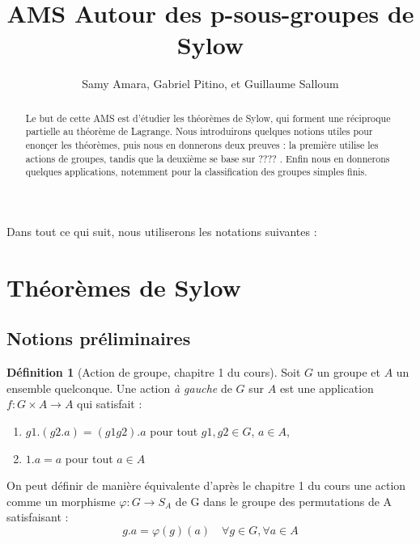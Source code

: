 \documentclass[french]{article}
\title{AMS Autour des p-sous-groupes de Sylow}
\author{Samy Amara, Gabriel Pitino, et Guillaume Salloum}
\date{}
\theoremstyle{definition}
\newtheorem{definition}[subsubsection]{Définition}
\theoremstyle{plain}
\theoremstyle{plain}
\theoremstyle{plain}
\theoremstyle{plain}
\theoremstyle{plain}
\begin{document}
\maketitle
\begin{abstract}
	Le but de cette AMS est d'étudier les théorèmes de Sylow, qui forment une réciproque partielle au théorème de Lagrange.
	Nous introduirons quelques notions utiles pour enonçer les théorèmes, puis nous en donnerons deux preuves : la première utilise les actions de groupes, tandis que la deuxième se base sur ????  .
	Enfin nous en donnerons quelques applications, notemment pour la classification des groupes simples finis.%
\end{abstract}



\tableofcontents
\clearpage

Dans tout ce qui suit, nous utiliserons les notations suivantes :
\glsaddall
\printglossary[title=Notations,type=symbols,style=long,nonumberlist]

\clearpage


\section{Théorèmes de Sylow}
\subsection{Notions préliminaires}


\begin{definition}[Action de groupe, chapitre 1 du cours]
	Soit \( G \) un groupe et \( A \) un ensemble quelconque. Une action \textit{à gauche} de \( G \) sur \( A \) est une application \( f : G \times A \rightarrow A\) qui satisfait :
	\begin{enumerate}[label = (\roman*)]
		\item \(g1.(g2.a) = (g1g2).a \) pour tout \(g1,g2 \in G\), \(a \in A\),
		\item \(1.a = a\) pour tout \(a \in A\)
	\end{enumerate}

	On peut définir de manière équivalente d'après le chapitre 1 du cours une action comme un morphisme \( \varphi : G \rightarrow S_{A} \) de G dans le groupe des permutations de A satisfaisant :
	\begin{equation}
		g.a = \varphi(g)(a) \quad \forall g \in G, \forall a \in A
	\end{equation}
\end{definition}
\end{document}
